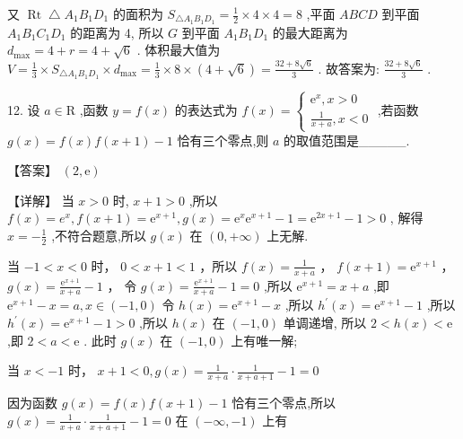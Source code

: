 \documentclass[10pt]{article}
\newcommand*\circled[1]{\tikz[baseline=(char.base)]{\node[shape=circle,draw,inner sep=1.5pt] (char) {\small #1};}}
\begin{document}
又 \(\operatorname{Rt}\bigtriangleup {A}_{1}{B}_{1}{D}_{1}\) 的面积为 \({S}_{\bigtriangleup {A}_{1}{B}_{1}{D}_{1}} = \frac{1}{2} \times  4 \times  4 = 8\) ,平面 \({ABCD}\) 到平面 \({A}_{1}{B}_{1}{C}_{1}{D}_{1}\) 的距离为 4, 所以 \(G\) 到平面 \({A}_{1}{B}_{1}{D}_{1}\) 的最大距离为 \({d}_{\max } = 4 + r = 4 + \sqrt{6}\) . 体积最大值为 \(V = \frac{1}{3} \times  {S}_{\bigtriangleup {A}_{1}{B}_{1}{D}_{1}} \times  {d}_{\max } = \frac{1}{3} \times  8 \times  \left( {4 + \sqrt{6}}\right)  = \frac{{32} + 8\sqrt{6}}{3}\) . 故答案为: \(\frac{{32} + 8\sqrt{6}}{3}\) .

12. 设 \(a \in  \mathrm{R}\) ,函数 \(y = f\left( x\right)\) 的表达式为 \(f\left( x\right)  = \left\{  \begin{array}{l} {\mathrm{e}}^{x},x > 0 \\  \frac{1}{x + a},x < 0 \end{array}\right.\) ,若函数 \(g\left( x\right)  = f\left( x\right) f\left( {x + 1}\right)  - 1\) 恰有三个零点,则 \(a\) 的取值范围是\_\_\_\_\_.

【答案】 \(\left( {2,\mathrm{e}}\right)\)

【详解】 \circled{1}  当 \(x > 0\) 时, \(x + 1 > 0\) ,所以 \(f\left( x\right)  = {e}^{x},f\left( {x + 1}\right)  = {\mathrm{e}}^{x + 1},g\left( x\right)  = {\mathrm{e}}^{x}{\mathrm{e}}^{x + 1} - 1 = {\mathrm{e}}^{{2x} + 1} - 1 > 0\) , 解得 \(x =  - \frac{1}{2}\) ,不符合题意,所以 \(g\left( x\right)\) 在 \(\left( {0, + \infty }\right)\) 上无解.

 \circled{2}  当 \(- 1 < x < 0\) 时， \(0 < x + 1 < 1\) ，所以 \(f\left( x\right)  = \frac{1}{x + a}\) ， \(f\left( {x + 1}\right)  = {\mathrm{e}}^{x + 1}\) ， \(g\left( x\right)  = \frac{{\mathrm{e}}^{x + 1}}{x + a} - 1\) ， 令 \(g\left( x\right)  = \frac{{\mathrm{e}}^{x + 1}}{x + a} - 1 = 0\) ,所以 \({\mathrm{e}}^{x + 1} = x + a\) ,即 \({\mathrm{e}}^{x + 1} - x = a,x \in  \left( {-1,0}\right)\) 令 \(h\left( x\right)  = {\mathrm{e}}^{x + 1} - x\) ,所以 \({h}^{\prime }\left( x\right)  = {\mathrm{e}}^{x + 1} - 1\) ,所以 \({h}^{\prime }\left( x\right)  = {\mathrm{e}}^{x + 1} - 1 > 0\) ,所以 \(h\left( x\right)\) 在 \(\left( {-1,0}\right)\) 单调递增, 所以 \(2 < h\left( x\right)  < \mathrm{e}\) ,即 \(2 < a < \mathrm{e}\) . 此时 \(g\left( x\right)\) 在 \(\left( {-1,0}\right)\) 上有唯一解;

 \circled{3}  当 \(x <  - 1\) 时， \(x + 1 < 0,g\left( x\right)  = \frac{1}{x + a} \cdot  \frac{1}{x + a + 1} - 1 = 0\)

因为函数 \(g\left( x\right)  = f\left( x\right) f\left( {x + 1}\right)  - 1\) 恰有三个零点,所以 \(g\left( x\right)  = \frac{1}{x + a} \cdot  \frac{1}{x + a + 1} - 1 = 0\) 在 \(\left( {-\infty , - 1}\right)\) 上有
\end{document}
